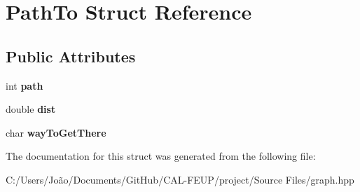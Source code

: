 \hypertarget{struct_path_to}{}\section{Path\+To Struct Reference}
\label{struct_path_to}
\subsection*{Public Attributes}
\begin{DoxyCompactItemize}
\item 
\mbox{\label{struct_path_to_ab1fb7e3450294504fc80aa6bb095d67b}} 
int {\bfseries path}
\item 
\mbox{\label{struct_path_to_aa9b62bb18468f26501755739b8b21e50}} 
double {\bfseries dist}
\item 
\mbox{\label{struct_path_to_a3d269791447d610a5ae3ffbf62fb23fb}} 
char {\bfseries way\+To\+Get\+There}
\end{DoxyCompactItemize}


The documentation for this struct was generated from the following file\+:\begin{DoxyCompactItemize}
\item 
C\+:/\+Users/\+João/\+Documents/\+Git\+Hub/\+C\+A\+L-\/\+F\+E\+U\+P/project/\+Source Files/graph.\+hpp\end{DoxyCompactItemize}
